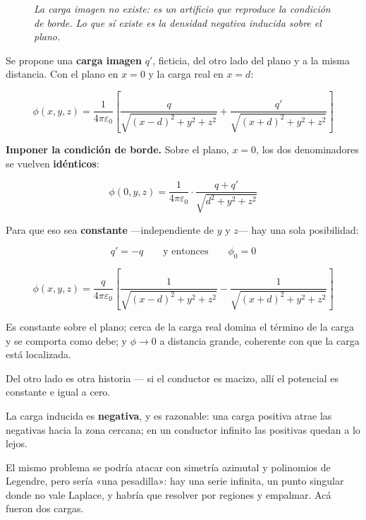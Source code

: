 \documentclass[12pt,a4paper]{article}
\begin{document}
\begin{figure}[H]
  \centering
  
  \caption*{\small\itshape La carga imagen no existe: es un artificio que
  reproduce la condición de borde. Lo que sí existe es la densidad negativa
  inducida sobre el plano.}
\end{figure}

Se propone una \textbf{carga imagen} $q'$, ficticia, del otro lado del plano y a
la misma distancia. Con el plano en $x=0$ y la carga real en $x=d$:

\[
\phi(x,y,z) = \frac{1}{4\pi\varepsilon_0}\left[
\frac{q}{\sqrt{(x-d)^2+y^2+z^2}} + \frac{q'}{\sqrt{(x+d)^2+y^2+z^2}}\right]
\]

\textbf{Imponer la condición de borde.} Sobre el plano, $x=0$, los dos
denominadores se vuelven \textbf{idénticos}:

\[
\phi(0,y,z) = \frac{1}{4\pi\varepsilon_0}\cdot\frac{q + q'}{\sqrt{d^2+y^2+z^2}}
\]

Para que eso sea \textbf{constante} ---independiente de $y$ y $z$--- hay una sola
posibilidad:

\[
\boxed{\;q' = -q \qquad\text{y entonces}\qquad \phi_0 = 0\;}
\]

\[
\phi(x,y,z) = \frac{q}{4\pi\varepsilon_0}\left[
\frac{1}{\sqrt{(x-d)^2+y^2+z^2}} - \frac{1}{\sqrt{(x+d)^2+y^2+z^2}}\right]
\]

\begin{notebox}
Es constante sobre el plano; cerca de la carga real domina el término de la carga
y se comporta como debe; y $\phi\to0$ a distancia grande, coherente con que la
carga está localizada.
\end{notebox}

\begin{warnbox}
Del otro lado es otra historia --- si el conductor es macizo, allí el potencial es
constante e igual a cero.
\end{warnbox}

La carga inducida es \textbf{negativa}, y es razonable: una carga positiva atrae
las negativas hacia la zona cercana; en un conductor infinito las positivas quedan
a lo lejos.

\begin{notebox}
El mismo problema se podría atacar con simetría azimutal y polinomios de Legendre,
pero sería «una pesadilla»: hay una serie infinita, un punto singular donde no vale
Laplace, y habría que resolver por regiones y empalmar. Acá fueron dos cargas.
\end{notebox}
\end{document}
